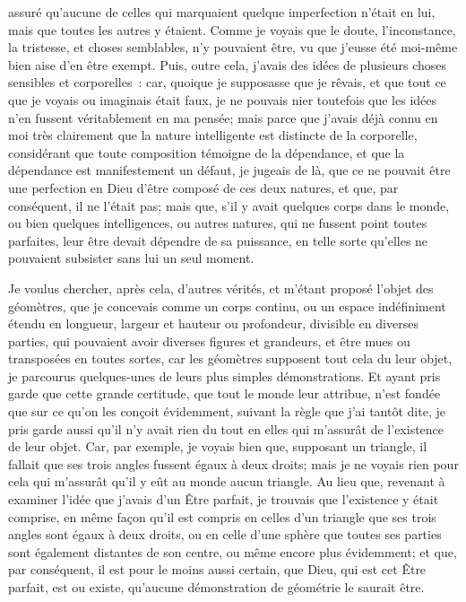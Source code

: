 \documentclass[french,twoside]{book} %
\begin{document}
assuré qu'aucune de celles qui marquaient quelque imperfection n'était en lui, mais que toutes les autres y étaient. Comme je voyais que le doute, l'inconstance, la tristesse, et choses semblables, n'y pouvaient être, vu que j'eusse été moi-même bien aise d'en être exempt. Puis, outre cela, j'avais des idées de plusieurs choses sensibles et corporelles : car, quoique je supposasse que je rêvais, et que tout ce que je voyais ou imaginais était faux, je ne pouvais nier toutefois que les idées n'en fussent véritablement en ma pensée; mais parce que j'avais déjà connu en moi très clairement que la nature intelligente est distincte de la corporelle, considérant que toute composition témoigne de la dépendance, et que la dépendance est manifestement un défaut, je jugeais de là, que ce ne pouvait être une perfection en Dieu d'être composé de ces deux natures, et que, par conséquent, il ne l'était pas; mais que, s'il y avait quelques corps dans le monde, ou bien quelques intelligences, ou autres natures, qui ne fussent point toutes parfaites, leur être devait dépendre de sa puissance, en telle sorte qu'elles ne pouvaient subsister sans lui un seul moment.\par
Je voulus chercher, après cela, d'autres vérités, et m'étant proposé l'objet des géomètres, que je concevais comme un corps continu, ou un espace indéfiniment étendu en longueur, largeur et hauteur ou profondeur, divisible en diverses parties, qui pouvaient avoir diverses figures et grandeurs, et être mues ou transposées en toutes sortes, car les géomètres supposent tout cela du leur objet, je parcourus quelques-unes de leurs plus simples démonstrations. Et ayant pris garde que cette grande certitude, que tout le monde leur attribue, n'est fondée que sur ce qu'on les conçoit évidemment, suivant la règle que j'ai tantôt dite, je pris garde aussi qu'il n'y avait rien du tout en elles qui m'assurât de l'existence de leur objet. Car, par exemple, je voyais bien que, supposant un triangle, il fallait que ses trois angles fussent égaux à deux droits; mais je ne voyais rien pour cela qui m'assurât qu'il y eût au monde aucun triangle. Au lieu que, revenant à examiner l'idée que j'avais d'un Être parfait, je trouvais que l'existence y était comprise, en même façon qu'il est compris en celles d'un triangle que ses trois angles sont égaux à deux droits, ou en celle d'une sphère que toutes ses parties sont également distantes de son centre, ou même encore plus évidemment; et que, par conséquent, il est pour le moins aussi certain, que Dieu, qui est cet Être parfait, est ou existe, qu'aucune démonstration de géométrie le saurait être.\par
\end{document}
